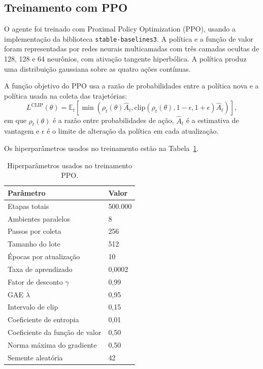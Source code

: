 \subsection{Treinamento com PPO}
\label{subsec:ppo}

O agente foi treinado com Proximal Policy Optimization (PPO), usando a
implementação da biblioteca \texttt{stable-baselines3}. A política e a função de
valor foram representadas por redes neurais multicamadas com três camadas
ocultas de 128, 128 e 64 neurônios, com ativação tangente hiperbólica. A política
produz uma distribuição gaussiana sobre as quatro ações contínuas.

A função objetivo do PPO usa a razão de probabilidades entre a política nova e a
política usada na coleta das trajetórias:
\begin{equation}
    L^{\mathrm{CLIP}}(\theta) =
    \mathbb{E}_{t}
    \left[
    \min
    \left(
    \rho_t(\theta)\hat{A}_t,
    \mathrm{clip}
    \left(
    \rho_t(\theta), 1-\epsilon, 1+\epsilon
    \right)\hat{A}_t
    \right)
    \right],
\end{equation}
em que $\rho_t(\theta)$ é a razão entre probabilidades de ação,
$\hat{A}_t$ é a estimativa de vantagem e $\epsilon$ é o limite de alteração da
política em cada atualização.

Os hiperparâmetros usados no treinamento estão na
Tabela~\ref{tab:hiperparametros_ppo}.

\begin{table}[htbp]
\centering
\caption{Hiperparâmetros usados no treinamento PPO.}
\label{tab:hiperparametros_ppo}
\begin{tabular}{ll}
\hline
Parâmetro & Valor \\
\hline
Etapas totais & 500.000 \\
Ambientes paralelos & 8 \\
Passos por coleta & 256 \\
Tamanho do lote & 512 \\
Épocas por atualização & 10 \\
Taxa de aprendizado & 0,0002 \\
Fator de desconto $\gamma$ & 0,99 \\
GAE $\lambda$ & 0,95 \\
Intervalo de clip & 0,15 \\
Coeficiente de entropia & 0,01 \\
Coeficiente da função de valor & 0,50 \\
Norma máxima do gradiente & 0,50 \\
Semente aleatória & 42 \\
\hline
\end{tabular}
\end{table}

